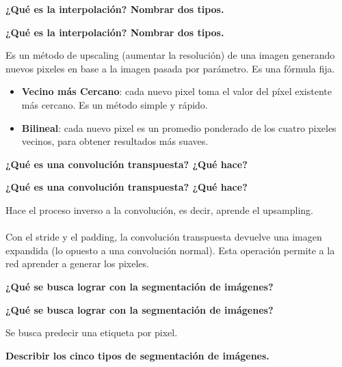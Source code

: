 \documentclass[10pt]{memoir}
\begin{document}
\clearpage
\begin{center}
	\textbf{\Large ¿Qué es la interpolación? Nombrar dos tipos.}
\end{center}

\clearpage
\begin{center}
	\textbf{\Large ¿Qué es la interpolación? Nombrar dos tipos.}
\end{center}
\noindent Es un método de upscaling (aumentar la resolución) de una imagen generando nuevos pixeles en base a la imagen pasada por parámetro. Es una fórmula fija.
\begin{itemize}
	\item \textbf{Vecino más Cercano}: cada nuevo pixel toma el valor del píxel existente más cercano. Es un método simple y rápido.
	\item \textbf{Bilineal}: cada nuevo pixel es un promedio ponderado de los cuatro pixeles vecinos, para obtener resultados más suaves.
\end{itemize}

\clearpage
\begin{center}
	\textbf{\Large ¿Qué es una convolución transpuesta? ¿Qué hace?}
\end{center}

\clearpage
\begin{center}
	\textbf{\Large ¿Qué es una convolución transpuesta? ¿Qué hace?}
\end{center}
\noindent Hace el proceso inverso a la convolución, es decir, aprende el upsampling. \\
\\
\noindent Con el stride y el padding, la convolución transpuesta devuelve una imagen expandida (lo opuesto a una convolución normal). Esta operación permite a la red aprender a generar los pixeles.

\clearpage
\begin{center}
	\textbf{\Large ¿Qué se busca lograr con la segmentación de imágenes?}
\end{center}

\clearpage
\begin{center}
	\textbf{\Large ¿Qué se busca lograr con la segmentación de imágenes?}
\end{center}
\noindent Se busca predecir una etiqueta por pixel.

\clearpage
\begin{center}
	\textbf{\Large Describir los cinco tipos de segmentación de imágenes.}
\end{center}
\end{document}
